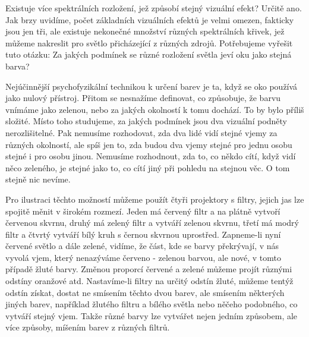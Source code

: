     Existuje více spektrálních rozložení, jež způsobí stejný vizuální efekt? Určitě ano. Jak brzy 
    uvidíme, počet základních vizuálních efektů je velmi omezen, fakticky jsou jen tři, ale 
    existuje nekonečné množství různých spektrálních křivek, jež můžeme nakreslit pro světlo 
    přicházející z různých zdrojů. Potřebujeme vyřešit tuto otázku: Za jakých podmínek se různé 
    rozložení světla jeví oku jako stejná barva?
    
    Nejúčinnější psychofyzikální technikou k určení barev je ta, když se oko používá jako nulový 
    přístroj. Přitom se nesnažíme definovat, co způsobuje, že barvu vnímáme jako zelenou, nebo za 
    jakých okolností k tomu dochází. To by bylo příliš složité. Místo toho studujeme, za jakých 
    podmínek jsou dva vizuální podněty nerozlišitelné. Pak nemusíme rozhodovat, zda dva lidé vidí 
    stejné vjemy za různých okolností, ale spíš jen to, zda budou dva vjemy stejné pro jednu osobu 
    stejné i pro osobu jinou. Nemusíme rozhodnout, zda to, co někdo cítí, když vidí něco zeleného, 
    je stejné jako to, co cítí jiný při pohledu na stejnou věc. O tom stejně nic nevíme.
    
    Pro ilustraci těchto možností můžeme použít čtyři projektory s filtry, jejich jas lze spojitě 
    měnit v širokém rozmezí. Jeden má červený filtr a na plátně vytvoří červenou skvrnu, druhý má 
    zelený filtr a vytváří zelenou skvrnu, třetí má modrý filtr a čtvrtý vytváří bílý kruh s černou 
    skvrnou uprostřed. Zapneme-li nyní červené světlo a dále zelené, vidíme, že část, kde se barvy 
    překrývají, v nás vyvolá vjem, který nenazýváme červeno - zelenou barvou, ale nové, v tomto 
    případě žluté barvy. Změnou proporcí červené a zelené můžeme projít různými odstíny oranžové 
    atd. Nastavíme-li filtry na určitý odstín žluté, můžeme tentýž odstín získat, dostat ne 
    smísením těchto dvou barev, ale smísením některých jiných barev, například žlutého filtru a 
    bílého světla nebo něčeho podobného, co vytváří stejný vjem. Takže různé barvy lze vytvářet 
    nejen jedním způsobem, ale více způsoby, míšením barev z různých filtrů.
    
